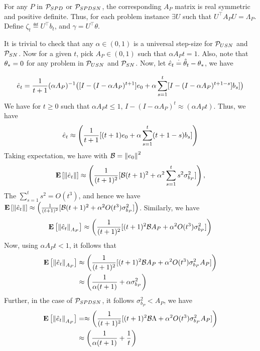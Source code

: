 For any $P$ in $\P_{SPD}$ or $\P_{SPDSN}$, the corresponding $A_P$ matrix is real symmetric and positive definite. Thus, for each problem instance $\exists U$ such that $U^\top A_P U=\Lambda_P$. Define $\zeta_t\eqdef U^\top b_t$, and $\gamma=U^\top \theta$.




It is trivial to check that any $\alpha \in (0,1)$ is a universal step-size for $\P_{USN}$ and $\P_{SN}$. Now for a given $t$, pick $A_P\in (0,1)$ such that $\alpha A_P t=1$. Also, note that $\ts=0$ for any problem in $\P_{USN}$ and $\P_{SN}$. Now, let $\eh_t\eqdef \thh_t-\ts$, we have

\begin{align}
\eh_t=\frac{1}{t+1}(\alpha A_P)^{-1}\big([I-(I-\alpha A_P)^{t+1}]e_0
+\alpha\sum_{s=1}^t [I-(I-\alpha A_P)^{t+1-s}] b_s]\big)
\end{align}
 We have for $t\geq 0$ such that $\alpha A_P t\leq 1$,  $I- (I-\alpha A_P)^t\approx(\alpha A_P t)$. Thus, we have 
\begin{align}
\eh_t \approx\left(\frac{1}{t+1}[ (t+1)e_0
+\alpha\sum_{s=1}^t (t+1-s)b_s]\right)
\end{align}
Taking expectation, we have with $\B=\norm{e_0}^2$
\begin{align}
\EE{\norm{\eh_t}}\approx\left( \frac{1}{(t+1)^2} [\B (t+1)^2+\alpha^2 \sum_{s=1}^{t} s^2 \sigma^2_{b_P}]\right),
\end{align}
The $\sum_{s=1}^t s^2= O(t^3)$, and hence we have $\EE{\norm{\eh_t}}\approx\left(\frac{1}{(t+1)^2} [\B (t+1)^2+\alpha^2 O(t^3) \sigma^2_{b_P}]\right)$. Similarly, we have 
\begin{align}
\EE{\norm{\eh_t}_{A_P}}\approx\left( \frac{1}{(t+1)^2} [(t+1)^2 \B A_P  +\alpha^2 O(t^3) \sigma^2_{b_P}]\right)
\end{align}
Now, using $\alpha A_P t <1$, it follows that 
\begin{align}
\EE{\norm{\eh_t}_{A_P}}& \approx\left(\frac{1}{(t+1)^2} [(t+1)^2\B A_P  +\alpha^2 O(t^3) \sigma^2_{b_P} A_P]\right) \\
&\approx\left(\frac{1}{\alpha (t+1)}+\alpha \sigma^2_{b_P}\right)
\end{align}
Further, in the case of $\P_{SPDSN}$, it follows $\sigma^2_{b_P}<A_P$, we have 
\begin{align}
\EE{\norm{\eh_t}_{A_P}}&=\approx \left(\frac{1}{(t+1)^2} [(t+1)^2\B \Lambda  +\alpha^2 O(t^3) \sigma^2_{b_P} A_P] \right)\\ 
&\approx\left(\frac{1}{\alpha (t+1)}+\frac{1}{t}\right)
\end{align}




